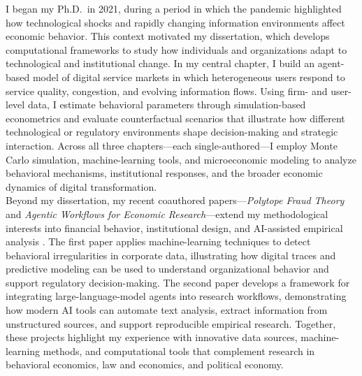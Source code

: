 \documentclass{nfr}
\begin{document}
I began my Ph.D.\ in 2021, during a period in which the pandemic highlighted how technological shocks and rapidly changing information environments affect economic behavior. 
This context motivated my dissertation, which develops computational frameworks to study how individuals and organizations adapt to technological and institutional change. 
In my central chapter, I build an agent-based model of digital service markets in which heterogeneous users respond to service quality, congestion, and evolving information flows. 
Using firm- and user-level data, I estimate behavioral parameters through simulation-based econometrics and evaluate counterfactual scenarios that illustrate how different technological or regulatory environments shape decision-making and strategic interaction. 
Across all three chapters—each single-authored—I employ Monte Carlo simulation, machine-learning tools, and microeconomic modeling to analyze behavioral mechanisms, institutional responses, and the broader economic dynamics of digital transformation.\\

Beyond my dissertation, my recent coauthored papers—\textit{Polytope Fraud Theory} and \textit{Agentic Workflows for Economic Research}—extend my methodological interests into financial behavior, institutional design, and AI-assisted empirical analysis \citep{Zhao2025, Dawid2025}. 
The first paper applies machine-learning techniques to detect behavioral irregularities in corporate data, illustrating how digital traces and predictive modeling can be used to understand organizational behavior and support regulatory decision-making. 
The second paper develops a framework for integrating large-language-model agents into research workflows, demonstrating how modern AI tools can automate text analysis, extract information from unstructured sources, and support reproducible empirical research. 
Together, these projects highlight my experience with innovative data sources, machine-learning methods, and computational tools that complement research in behavioral economics, law and economics, and political economy.\\
\end{document}
